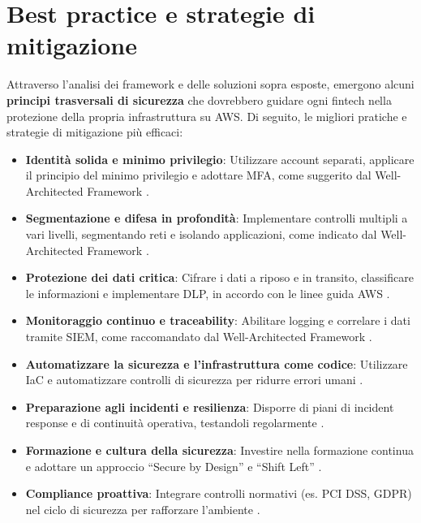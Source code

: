 \documentclass[a4paper,12pt]{report}
\begin{document}
\section{Best practice e strategie di mitigazione}
\label{sec:best_practices}
Attraverso l’analisi dei framework e delle soluzioni sopra esposte, emergono alcuni \textbf{principi trasversali di sicurezza} che dovrebbero guidare ogni fintech nella protezione della propria infrastruttura su AWS. Di seguito, le migliori pratiche e strategie di mitigazione più efficaci:
\begin{itemize}
    \item \textbf{Identità solida e minimo privilegio}: Utilizzare account separati, applicare il principio del minimo privilegio e adottare MFA, come suggerito dal Well-Architected Framework \cite{awsWellArchitected}.
    \item \textbf{Segmentazione e difesa in profondità}: Implementare controlli multipli a vari livelli, segmentando reti e isolando applicazioni, come indicato dal Well-Architected Framework \cite{awsWellArchitected}.
    \item \textbf{Protezione dei dati critica}: Cifrare i dati a riposo e in transito, classificare le informazioni e implementare DLP, in accordo con le linee guida AWS \cite{awsWellArchitected}.
    \item \textbf{Monitoraggio continuo e traceability}: Abilitare logging e correlare i dati tramite SIEM, come raccomandato dal Well-Architected Framework \cite{awsWellArchitected}.
    \item \textbf{Automatizzare la sicurezza e l'infrastruttura come codice}: Utilizzare IaC e automatizzare controlli di sicurezza per ridurre errori umani \cite{awsWellArchitected}.
    \item \textbf{Preparazione agli incidenti e resilienza}: Disporre di piani di incident response e di continuità operativa, testandoli regolarmente \cite{awsWellArchitected}.
    \item \textbf{Formazione e cultura della sicurezza}: Investire nella formazione continua e adottare un approccio “Secure by Design” e “Shift Left” \cite{netguru2023}.
    \item \textbf{Compliance proattiva}: Integrare controlli normativi (es. PCI DSS, GDPR) nel ciclo di sicurezza per rafforzare l'ambiente \cite{netguru2023}.
\end{itemize}
\end{document}
